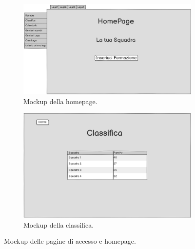 \begin{figure}[H]
    \begin{subfigure}[b]{0.49\textwidth}
        \centering
        \includegraphics[width=\textwidth]{Resources/Mockups/HomePage.png}
        \caption{Mockup della homepage.}
        \label{fig:pagina_homepage}
    \end{subfigure}
    \hfill
    \begin{subfigure}[b]{0.49\textwidth}
        \centering
        \includegraphics[width=\textwidth]{Resources/Mockups/Classifica.png}
        \caption{Mockup della classifica.}
        \label{fig:pagina_classifica}
    \end{subfigure}

    \caption{Mockup delle pagine di accesso e homepage.}
    \label{fig:mockup_parte1}
\end{figure}
